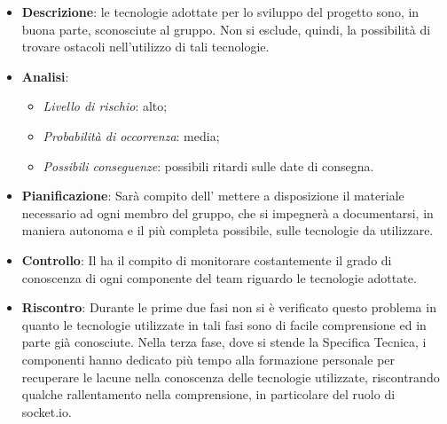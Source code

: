 			\begin{itemize}
				\item \textbf{Descrizione}: le tecnologie adottate per lo sviluppo del progetto sono, in buona parte, sconosciute al gruppo. Non si esclude, quindi, la possibilità di trovare ostacoli nell'utilizzo di tali tecnologie.
				\item \textbf{Analisi}:
					\begin{itemize}
						\item \textit{Livello di rischio}: alto;
						\item \textit{Probabilità di occorrenza}: media;
						\item \textit{Possibili conseguenze}: possibili ritardi sulle date di consegna.
					\end{itemize}
				\item \textbf{Pianificazione}: Sarà compito dell' mettere a disposizione il materiale necessario ad ogni membro del gruppo, che si impegnerà a documentarsi, in maniera autonoma e il più completa possibile, sulle tecnologie da utilizzare.
				\item \textbf{Controllo}: Il  ha il compito di monitorare costantemente il grado di conoscenza di ogni componente del team riguardo le tecnologie adottate.
				\item \textbf{Riscontro}: Durante le prime due fasi non si è verificato questo problema in quanto le tecnologie utilizzate in tali fasi sono di facile comprensione ed in parte già conosciute. Nella terza fase, dove si stende la Specifica Tecnica, i componenti hanno dedicato più tempo alla formazione personale per recuperare le lacune nella conoscenza delle tecnologie utilizzate, riscontrando qualche rallentamento nella comprensione, in particolare del ruolo di socket.io.
			\end{itemize}
